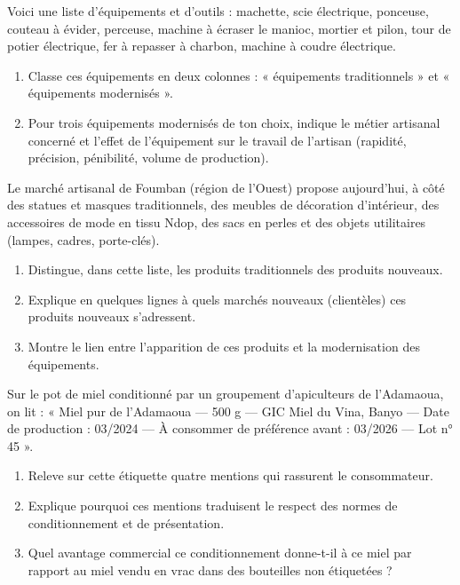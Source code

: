 \documentclass[11pt]{article}
\newcounter{popsec}
\newcounter{popsub}
\newcommand{\courssub}[1]{%
  \stepcounter{popsub}%
  \par\vspace{9pt}\noindent{\popxbold\fontsize{11.5}{13}\selectfont\color{popink}{\color{poporange}\thepopsec.\thepopsub}\hspace{6pt}#1}\par\nopagebreak\vspace{4pt}
}
\begin{document}
\courssub{Je m'entraîne}

\begin{exercice}
Voici une liste d'équipements et d'outils : machette, scie électrique, ponceuse, couteau à évider, perceuse, machine à écraser le manioc, mortier et pilon, tour de potier électrique, fer à repasser à charbon, machine à coudre électrique.
\begin{enumerate}
\item Classe ces équipements en deux colonnes : « équipements traditionnels » et « équipements modernisés ».
\item Pour trois équipements modernisés de ton choix, indique le métier artisanal concerné et l'effet de l'équipement sur le travail de l'artisan (rapidité, précision, pénibilité, volume de production).
\end{enumerate}
\end{exercice}

\begin{exercice}
Le marché artisanal de Foumban (région de l'Ouest) propose aujourd'hui, à côté des statues et masques traditionnels, des meubles de décoration d'intérieur, des accessoires de mode en tissu Ndop, des sacs en perles et des objets utilitaires (lampes, cadres, porte-clés).
\begin{enumerate}
\item Distingue, dans cette liste, les produits traditionnels des produits nouveaux.
\item Explique en quelques lignes à quels marchés nouveaux (clientèles) ces produits nouveaux s'adressent.
\item Montre le lien entre l'apparition de ces produits et la modernisation des équipements.
\end{enumerate}
\end{exercice}

\begin{exercice}
Sur le pot de miel conditionné par un groupement d'apiculteurs de l'Adamaoua, on lit : « Miel pur de l'Adamaoua — 500 g — GIC Miel du Vina, Banyo — Date de production : 03/2024 — À consommer de préférence avant : 03/2026 — Lot n° 45 ».
\begin{enumerate}
\item Releve sur cette étiquette quatre mentions qui rassurent le consommateur.
\item Explique pourquoi ces mentions traduisent le respect des normes de conditionnement et de présentation.
\item Quel avantage commercial ce conditionnement donne-t-il à ce miel par rapport au miel vendu en vrac dans des bouteilles non étiquetées ?
\end{enumerate}
\end{exercice}
\end{document}
